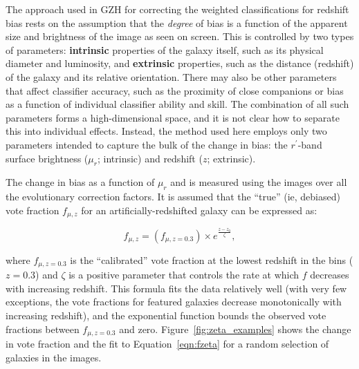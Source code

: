 \documentclass[twocolumn]{aastex6}
\begin{document}
The approach used in GZH for correcting the weighted classifications for
redshift bias rests on the assumption that the \emph{degree} of bias is a
function of the apparent size and brightness of the image as seen on screen.
This is controlled by two types of parameters: \textbf{intrinsic} properties of
the galaxy itself, such as its physical diameter and luminosity, and
\textbf{extrinsic} properties, such as the distance (redshift) of the galaxy
and its relative orientation. There may also be other parameters that affect
classifier accuracy, such as the proximity of close companions or bias as a
function of individual classifier ability and skill. The combination of all
such parameters forms a high-dimensional space, and it is not clear how to
separate this into individual effects. Instead, the method used here employs
only two parameters intended to capture the bulk of the change in bias: the
$r^\prime$-band surface brightness ($\mu_r$; intrinsic) and redshift ($z$;
extrinsic). 

The change in bias as a function of $\mu_r$ and \zsim{} is measured using the
\ferengi{} images over all the evolutionary correction factors. It is assumed
that the ``true'' (ie, debiased) vote fraction $f_{\mu,z}$ for an
artificially-redshifted galaxy can be expressed as:

\begin{equation}
f_{\mu,z} = \left(f_{\mu,z=0.3}\right) \times e^{{\frac{z-z_0}{\zeta}}},
\label{eqn:fzeta}
\end{equation}

\noindent where $f_{\mu,z=0.3}$ is the ``calibrated'' vote fraction at the
lowest redshift in the \ferengi{} bins ($z=0.3$) and $\zeta$ is a positive
parameter that controls the rate at which $f$ decreases with increasing
redshift. This formula fits the data relatively well (with very few exceptions,
the vote fractions for featured galaxies decrease monotonically with increasing
redshift), and the exponential function bounds the observed vote fractions
between $f_{\mu,z=0.3}$ and zero. Figure~\ref{fig:zeta_examples} shows the
change in vote fraction and the fit to Equation~\ref{eqn:fzeta} for a random
selection of galaxies in the \ferengi{} images. 
\end{document}
